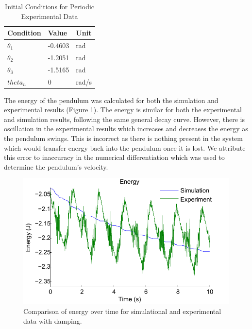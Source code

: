 \begin{table}[H]
\centering
 \begin{tabular}{|l|l|l|}
        \hline
        Condition  & Value  & Unit        \\ \hline
        $\theta_1$ & -0.4603  & rad          \\ 
        $\theta_2$ & -1.2051  & rad          \\ 
        $\theta_3$ & -1.5165  & rad          \\ 
        $\dot{theta_n}$ & 0  & rad/s          \\ 
        \hline
    \end{tabular}
    \caption{Initial Conditions for Periodic Experimental Data}
    \label{initials}
\end{table}

The energy of the pendulum was calculated for both the simulation and experimental results (Figure \ref{energyresults}).  The energy is similar for both the experimental and simulation results, following the same general decay curve.  However, there is oscillation in the experimental results which increases and decreases the energy as the pendulum swings.  This is incorrect as there is nothing present in the system which would transfer energy back into the pendulum once it is lost.  We attribute this error to inaccuracy in the numerical differentiation which was used to determine the pendulum's velocity.

\begin{figure}[H]
\centering
\includegraphics[scale=0.65]{comparison_energy_damped.pdf}
\caption{Comparison of energy over time for simulational and experimental data with damping.}
\label{energyresults}
\end{figure} 

